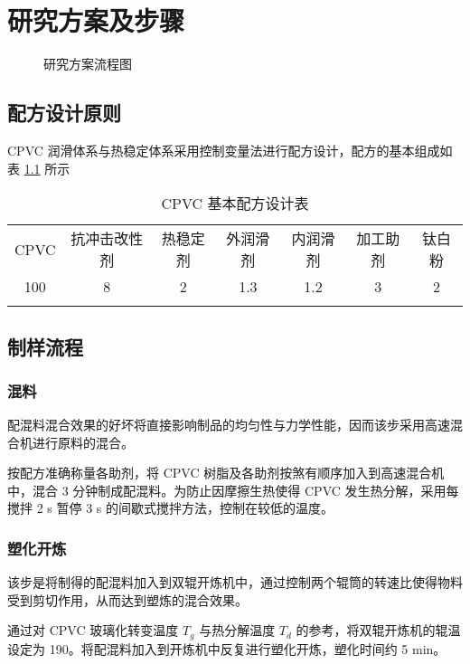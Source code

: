 \chapter{研究方案及步骤}

\begin{figure}[!htbp]
    \begin{center}
        
    \end{center}
    \caption{研究方案流程图}
\end{figure}

\section{配方设计原则}
CPVC 润滑体系与热稳定体系采用控制变量法进行配方设计，配方的基本组成如表 \ref{tabCPVCFormula} 所示

\begin{table}[!htbp]
    \caption{CPVC 基本配方设计表}
    \label{tabCPVCFormula}
    \begin{center}
    \footnotesize{
        \begin{tabular}{ccccccc}
            \Xhline{1pt}
            CPVC & 抗冲击改性剂 & 热稳定剂 & 外润滑剂 & 内润滑剂 & 加工助剂 & 钛白粉 \\
            \Xhline{0.5pt}
            100\footnotemark[1] & 8 & 2 & 1.3 & 1.2 & 3 & 2   \\
            \Xhline{1pt}
        \end{tabular}
    }
    \end{center}
\end{table}

\section{制样流程}

\subsection{混料}
配混料混合效果的好坏将直接影响制品的均匀性与力学性能，因而该步采用高速混合机进行原料的混合。\par
按配方准确称量各助剂，将 CPVC 树脂及各助剂按煞有顺序加入到高速混合机中，混合 3 分钟制成配混料。为防止因摩擦生热使得 CPVC 发生热分解，采用每搅拌 2 s 暂停 3 s 的间歇式搅拌方法，控制在较低的温度。

\subsection{塑化开炼}
该步是将制得的配混料加入到双辊开炼机中，通过控制两个辊筒的转速比使得物料受到剪切作用，从而达到塑炼的混合效果。\par
通过对 CPVC 玻璃化转变温度 $T_g$ 与热分解温度 $T_d$ 的参考，将双辊开炼机的辊温设定为 190\cd。将配混料加入到开炼机中反复进行塑化开炼，塑化时间约 5 min。

